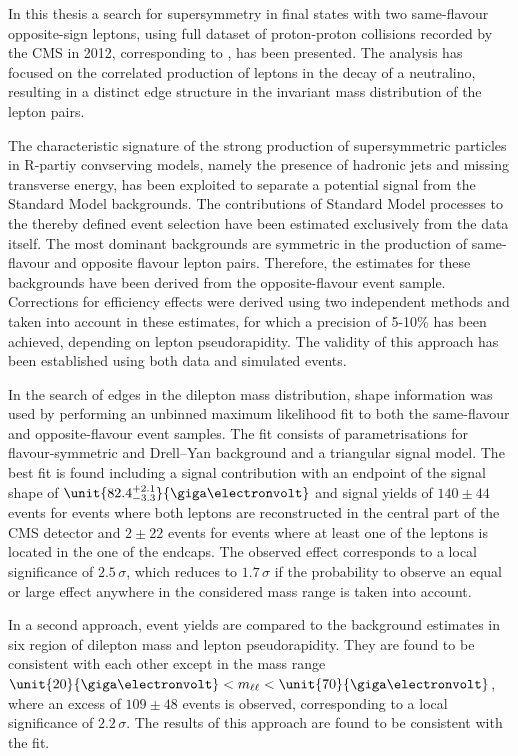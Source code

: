 In this thesis a search for supersymmetry in final states with two same-flavour opposite-sign leptons, using full dataset of proton-proton collisions recorded by the CMS in 2012, corresponding to \lumi, has been presented. The analysis has focused on the correlated production of leptons in the decay of a neutralino, resulting in a distinct edge structure in the invariant mass distribution of the lepton pairs. 

The characteristic signature of the strong production of supersymmetric particles in R-partiy convserving models, namely the presence of hadronic jets and missing transverse energy, has been exploited to separate a potential signal from the Standard Model backgrounds. The contributions of Standard Model processes to the thereby defined event selection have been estimated exclusively from the data itself. The most dominant backgrounds are symmetric in the production of same-flavour and opposite flavour lepton pairs. Therefore, the estimates for these backgrounds have been derived from the opposite-flavour event sample. Corrections for efficiency effects were derived using two independent methods and taken into account in these estimates, for which a precision of 5-10\% has been achieved, depending on lepton pseudorapidity. The validity of this approach has been established using both data and simulated events. 

In the search of edges in the dilepton mass distribution, shape information was used by performing an unbinned maximum likelihood fit to both the same-flavour and opposite-flavour event samples. The fit consists of parametrisations for flavour-symmetric and Drell--Yan background and a triangular signal model. The best fit is found including a signal contribution with an endpoint of the signal shape of $\unit{82.4^{+2.1}_{-3.3}}{\giga\electronvolt}$ and signal yields of $140\pm44$ events for events where both leptons are reconstructed in the central part of the CMS detector and $2\pm22$ events for events where at least one of the leptons is located in the one of the endcaps. The observed effect corresponds to a local significance of $2.5\,\sigma$, which reduces to $1.7\,\sigma$ if the probability to observe an equal or large effect anywhere in the considered mass range is taken into account. 

In a second approach, event yields are compared to the background estimates in six region of dilepton mass and lepton pseudorapidity. They are found to be consistent with each other except in the mass range $\unit{20}{\giga\electronvolt} < \mll < \unit{70}{\giga\electronvolt}$, where an excess of $109\pm48$ events is observed, corresponding to a local significance of $2.2\,\sigma$. The results of this approach are found to be consistent with the fit. 

